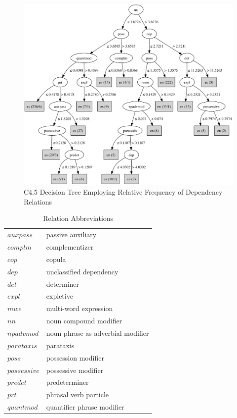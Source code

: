 \documentclass[main.tex]{subfiles}
\begin{document}
\begin{figure}[htbp]
\centering
\includegraphics[width=6in]{c45-dep-graph.pdf}
\caption{C4.5 Decision Tree Employing Relative Frequency of Dependency Relations}
\label{fig:c4.5-dep-tree}
\end{figure}

\begin{table}[ht]
\small
\centering
\caption{Relation Abbreviations}
\begin{tabular}{ l  l }
    \toprule
$auxpass$ & passive auxiliary \\
$complm$ & complementizer \\
$cop$ & copula \\
$dep$ & unclassified dependency \\
$det$ & determiner \\
$expl$ & expletive\\
$mwe$ & multi-word expression \\
$nn$ & noun compound modifier \\
$npadvmod$ & noun phrase as adverbial modifier \\
$parataxis$ & parataxis \\
$poss$ & possession modifier \\
$possessive$ & possessive modifier \\
$predet$ & predeterminer \\
$prt$ & phrasal verb particle \\
$quantmod$ & quantifier phrase modifier \\
\bottomrule
\end{tabular}
\label{table:reln-abbr}
\end{table}
\end{document}
